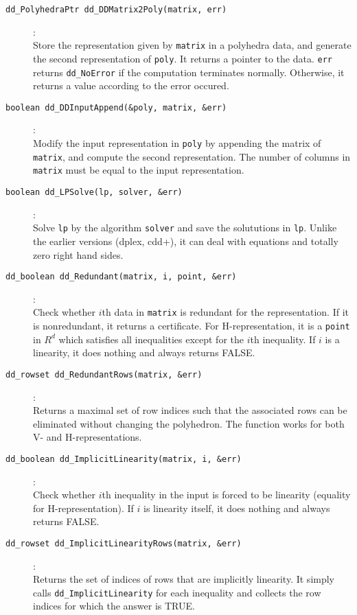 \documentclass[11pt]{article}
\newcommand {\0} {{\bf 0}}
\begin{document}
\begin{description}
\item[{\tt dd\_PolyhedraPtr dd\_DDMatrix2Poly(matrix, err)}]:\\
Store the representation given by {\tt matrix} in a polyhedra data, and
generate the second representation of {\tt *poly}.  It returns
a pointer to the data. {\tt *err}
returns {\tt dd\_NoError} if the computation terminates normally.  Otherwise,
it returns a value according to the error occured.

\item[{\tt boolean dd\_DDInputAppend(\&poly, matrix, \&err)}]:\\
Modify the input representation in {\tt *poly}
by appending the matrix of {\tt *matrix}, and compute
the second representation.  The number of columns in
{\tt *matrix} must be equal to the input representation.

\item[{\tt boolean dd\_LPSolve(lp, solver, \&err)}]:\\
Solve {\tt lp} by the algorithm {\tt solver} and save
the solututions in {\tt *lp}.  Unlike the earlier versions
(dplex, cdd+), it can deal with equations and totally zero right
hand sides.

\item[{\tt dd\_boolean dd\_Redundant(matrix, i, point, \&err)}]:\\
Check whether $i$th data in {\tt matrix} is redundant for the representation.
If it is nonredundant, it returns a certificate.  For H-representation,
it is a {\tt point} in $R^d$ which satisfies
all inequalities except for the $i$th inequality.  If $i$ is a linearity,
it does nothing and always returns FALSE.

\item[{\tt dd\_rowset dd\_RedundantRows(matrix, \&err)}]:\\
Returns a maximal set of row indices such that the associated rows
can be eliminated without changing the polyhedron.  
The function works for both V- and H-representations.

\item[{\tt dd\_boolean dd\_ImplicitLinearity(matrix, i, \&err)}]:\\
Check whether $i$th inequality
in the input is forced to be linearity (equality 
for H-representation).
If $i$ is linearity itself, 
it does nothing and always returns FALSE.

\item[{\tt dd\_rowset dd\_ImplicitLinearityRows(matrix, \&err)}]:\\
Returns the set of indices of rows that are 
implicitly linearity.  It simply calls
{\tt dd\_ImplicitLinearity} for each inequality and collects
the row indices for which the answer is TRUE.


\end{description}
\end{document}
